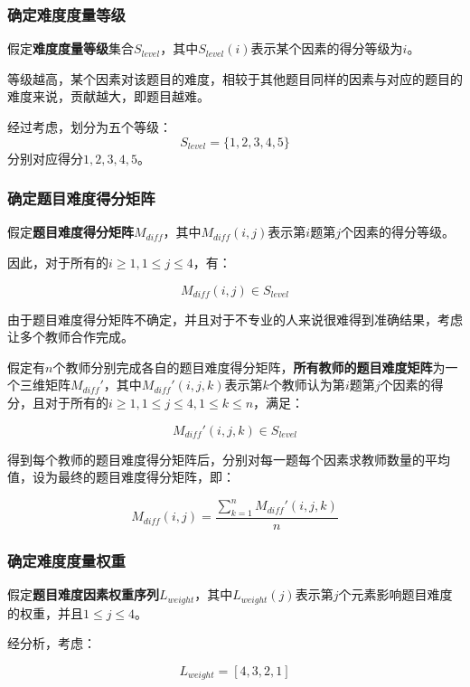 \subsubsection{确定难度度量等级}

假定\textbf{难度度量等级}集合$S_{level}$，其中$S_{level}(i)$表示某个因素的得分等级为$i$。

等级越高，某个因素对该题目的难度，相较于其他题目同样的因素与对应的题目的难度来说，贡献越大，即题目越难。

经过考虑，划分为五个等级：
$$S_{level} = \{1, 2, 3, 4, 5\}$$
分别对应得分$1, 2, 3, 4, 5$。

\subsubsection{确定题目难度得分矩阵}

假定\textbf{题目难度得分矩阵}$M_{diff}$，其中$M_{diff}(i, j)$表示第$i$题第$j$个因素的得分等级。

因此，对于所有的$i \geq 1, 1 \leq j \leq 4$，有：

$$M_{diff}(i, j)\in S_{level}$$

由于题目难度得分矩阵不确定，并且对于不专业的人来说很难得到准确结果，考虑让多个教师合作完成。

假定有$n$个教师分别完成各自的题目难度得分矩阵，\textbf{所有教师的题目难度矩阵}为一个三维矩阵$M_{diff}'$，其中$M_{diff}'(i, j, k)$表示第$k$个教师认为第$i$题第$j$个因素的得分，且对于所有的$i \geq 1, 1 \leq j \leq 4, 1 \leq k \leq n$，满足：

$$M_{diff}'(i, j, k)\in S_{level}$$

得到每个教师的题目难度得分矩阵后，分别对每一题每个因素求教师数量的平均值，设为最终的题目难度得分矩阵，即：

\begin{equation}
    M_{diff}(i, j) = 
    \frac{
        \sum_{k = 1}^{n}M_{diff}'(i, j, k)
    }{n}
\end{equation}

\subsubsection{确定难度度量权重}

假定\textbf{题目难度因素权重序列}$L_{weight}$，其中$L_{weight}(j)$表示第$j$个元素影响题目难度的权重，并且$1 \leq j \leq 4$。

经分析，考虑：

\begin{equation}
    L_{weight} = [4, 3, 2, 1]
\end{equation}

